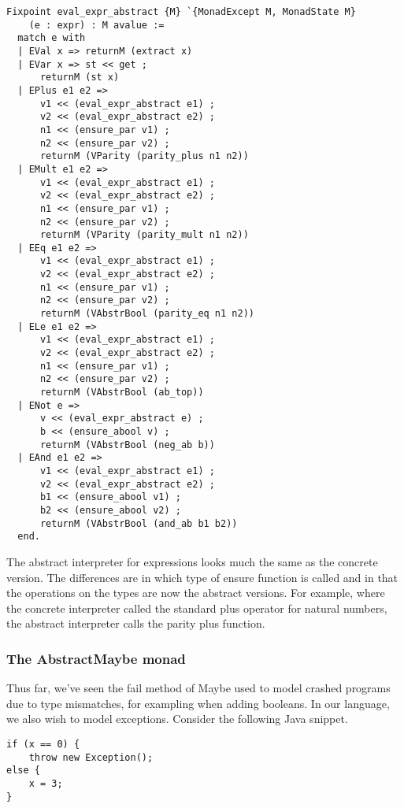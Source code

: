 \begin{listing}[H]
\begin{verbatim}
Fixpoint eval_expr_abstract {M} `{MonadExcept M, MonadState M} 
    (e : expr) : M avalue :=
  match e with
  | EVal x => returnM (extract x)
  | EVar x => st << get ;
      returnM (st x)
  | EPlus e1 e2 => 
      v1 << (eval_expr_abstract e1) ;
      v2 << (eval_expr_abstract e2) ;
      n1 << (ensure_par v1) ;
      n2 << (ensure_par v2) ;
      returnM (VParity (parity_plus n1 n2))
  | EMult e1 e2 =>
      v1 << (eval_expr_abstract e1) ;
      v2 << (eval_expr_abstract e2) ;
      n1 << (ensure_par v1) ;
      n2 << (ensure_par v2) ;
      returnM (VParity (parity_mult n1 n2))
  | EEq e1 e2 =>
      v1 << (eval_expr_abstract e1) ;
      v2 << (eval_expr_abstract e2) ;
      n1 << (ensure_par v1) ;
      n2 << (ensure_par v2) ;
      returnM (VAbstrBool (parity_eq n1 n2))
  | ELe e1 e2 =>
      v1 << (eval_expr_abstract e1) ;
      v2 << (eval_expr_abstract e2) ;
      n1 << (ensure_par v1) ;
      n2 << (ensure_par v2) ;
      returnM (VAbstrBool (ab_top))
  | ENot e =>
      v << (eval_expr_abstract e) ;
      b << (ensure_abool v) ;
      returnM (VAbstrBool (neg_ab b))
  | EAnd e1 e2 =>
      v1 << (eval_expr_abstract e1) ;
      v2 << (eval_expr_abstract e2) ;
      b1 << (ensure_abool v1) ;
      b2 << (ensure_abool v2) ;
      returnM (VAbstrBool (and_ab b1 b2))
  end.
\end{verbatim}
\end{listing}

The abstract interpreter for expressions looks much the same as the concrete
version. The differences are in which type of ensure function is called and in
that the operations on the types are now the abstract versions. For example,
where the concrete interpreter called the standard plus operator for natural
numbers, the abstract interpreter calls the parity plus function.

\subsubsection{The AbstractMaybe monad}
Thus far, we've seen the fail method of Maybe used to model crashed programs
due to type mismatches, for exampling when adding booleans. In our language, we
also wish to model exceptions. Consider the following Java snippet.

\begin{verbatim}
if (x == 0) {
    throw new Exception();
else {
    x = 3;
}
\end{verbatim}

